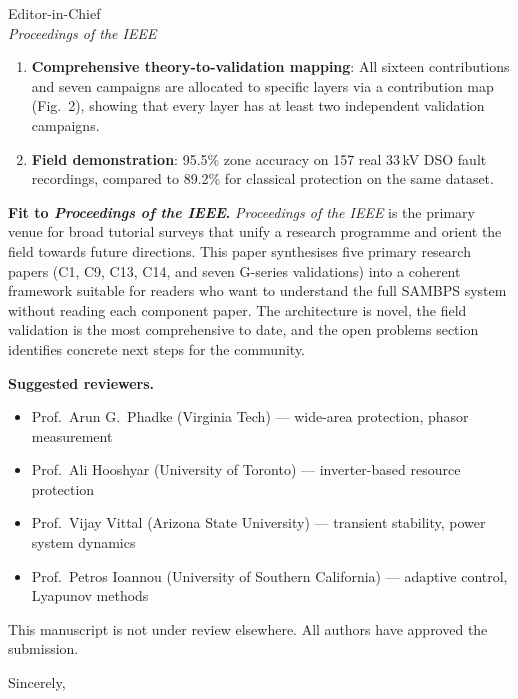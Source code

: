 \documentclass[11pt,a4paper]{letter}
\begin{document}
\begin{letter}{Editor-in-Chief\\
               \textit{Proceedings of the IEEE}}
\begin{enumerate}
  \item \textbf{Comprehensive theory-to-validation mapping}: All
        sixteen contributions and seven campaigns are allocated to
        specific layers via a contribution map (Fig.~2), showing that
        every layer has at least two independent validation campaigns.

  \item \textbf{Field demonstration}: 95.5\% zone accuracy on
        157 real 33\,kV DSO fault recordings, compared to 89.2\%
        for classical protection on the same dataset.
\end{enumerate}

\textbf{Fit to \textit{Proceedings of the IEEE}.}
\textit{Proceedings of the IEEE} is the primary venue for broad
tutorial surveys that unify a research programme and orient the field
towards future directions.  This paper synthesises five primary
research papers (C1, C9, C13, C14, and seven G-series validations)
into a coherent framework suitable for readers who want to understand
the full SAMBPS system without reading each component paper.  The
architecture is novel, the field validation is the most comprehensive
to date, and the open problems section identifies concrete next steps
for the community.

\textbf{Suggested reviewers.}
\begin{itemize}
  \item Prof.\ Arun G.\ Phadke (Virginia Tech)
        --- wide-area protection, phasor measurement
  \item Prof.\ Ali Hooshyar (University of Toronto)
        --- inverter-based resource protection
  \item Prof.\ Vijay Vittal (Arizona State University)
        --- transient stability, power system dynamics
  \item Prof.\ Petros Ioannou (University of Southern California)
        --- adaptive control, Lyapunov methods
\end{itemize}

This manuscript is not under review elsewhere.
All authors have approved the submission.

\closing{Sincerely,}
\end{letter}
\end{document}
